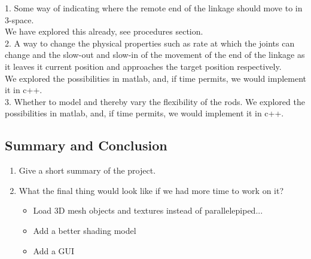 \documentclass[paper=a4, fontsize=11pt]{scrartcl} %
\numberwithin{equation}{section} %
\numberwithin{figure}{section} %
\numberwithin{table}{section} %
\begin{document}
1. Some way of indicating where the remote end of the linkage should move to in 3-space.\\
We have explored this already, see procedures section.\\

2. A way to change the physical properties such as rate at which the joints can change and the slow-out and slow-in of the movement of the end of the linkage as it leaves it current position and approaches the target position respectively.\\
We explored the possibilities in matlab, and, if time permits, we would implement it in c++.\\


3. Whether to model and thereby vary the flexibility of the rods.
We explored the possibilities in matlab, and, if time permits, we would implement it in c++.\\



\subsection{Summary and Conclusion}

\begin{enumerate}
\item Give a short summary of the project.
\item What the final thing would look like if we had more time to work on it?

\begin{itemize}
	\item Load 3D mesh objects and textures instead of parallelepiped...
	\item Add a better shading model
	\item Add a GUI
\end{itemize}
\end{enumerate}
\nocite{Fedor2003}
\nocite{Welman1993}
\nocite{Crai55}
{}

\end{document}
